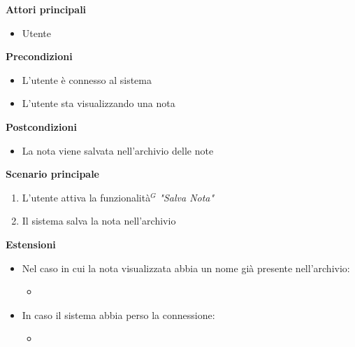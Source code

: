 \documentclass[a4paper,10pt]{article}
\begin{document}
    \textbf{Attori principali}
    \begin{itemize}
        \item Utente
    \end{itemize}
    \textbf{Precondizioni}
    \begin{itemize}
        \item L'utente è connesso al sistema
        \item L'utente sta visualizzando una nota
    \end{itemize}
    \textbf{Postcondizioni}
    \begin{itemize}
        \item La nota viene salvata nell'archivio delle note
    \end{itemize}
    \textbf{Scenario principale}
    \begin{enumerate}
        \item L'utente attiva la funzionalità$^G$ \textit{"Salva Nota"}
        \item Il sistema salva la nota nell'archivio
    \end{enumerate}
    \textbf{Estensioni}
    \begin{itemize}
        \item Nel caso in cui la nota visualizzata abbia un nome già presente nell'archivio:
        \begin{itemize}
            \item {}
        \end{itemize}
        \item In caso il sistema abbia perso la connessione:
        \begin{itemize}
            \item {}
        \end{itemize}
    \end{itemize}
\end{document}
